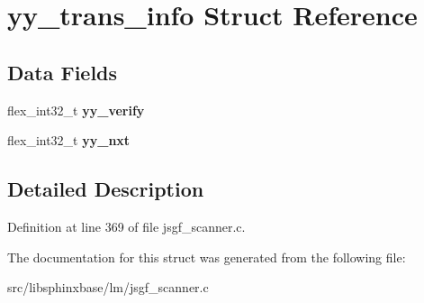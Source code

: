 \section{yy\-\_\-trans\-\_\-info Struct Reference}
\label{structyy__trans__info}
\subsection*{Data Fields}
\begin{DoxyCompactItemize}
\item 
flex\-\_\-int32\-\_\-t {\bfseries yy\-\_\-verify}\label{structyy__trans__info_a5c9f61e770deef50bd4e697310342fe9}

\item 
flex\-\_\-int32\-\_\-t {\bfseries yy\-\_\-nxt}\label{structyy__trans__info_ae0715250c2bef261e596e77e0030f13e}

\end{DoxyCompactItemize}


\subsection{Detailed Description}


Definition at line 369 of file jsgf\-\_\-scanner.\-c.



The documentation for this struct was generated from the following file\-:\begin{DoxyCompactItemize}
\item 
src/libsphinxbase/lm/jsgf\-\_\-scanner.\-c\end{DoxyCompactItemize}
